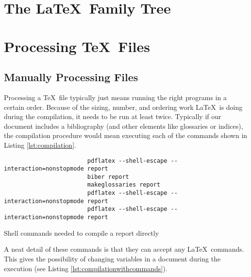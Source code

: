 \documentclass[hidelinks, float=false, crop=false]{standalone}
\begin{document}
    \section{The \LaTeX~Family Tree}
    \section{Processing \TeX~Files}
        \subsection{Manually Processing Files}
            Processing a \TeX~file typically just means running the right programs in a certain order.
            Because of the sizing, number, and ordering work \LaTeX~is doing during the compilation, it needs to be run at least twice.
            Typically if our document includes a bibliography (and other elements like glossaries or indices), the compilation procedure would mean executing each of the commands shown in Listing \ref{lst:compilation}.
            \begin{listing}[H]
                \begin{centering}
                    \begin{verbatim}
                        pdflatex --shell-escape --interaction=nonstopmode report
                        biber report
                        makeglossaries report
                        pdflatex --shell-escape --interaction=nonstopmode report
                        pdflatex --shell-escape --interaction=nonstopmode report
                    \end{verbatim}
                    \caption{Shell commands needed to compile a report directly}
                    \label{lst:compilation}
                \end{centering}
            \end{listing}
            A neat detail of these commands is that they can accept any \LaTeX~commands.
            This gives the possibility of changing variables in a document during the execution (see Listing \ref{lst:compilationwithcommands}).
\end{document}
